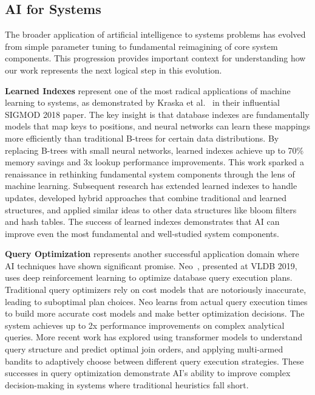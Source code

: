 \subsection{AI for Systems}

The broader application of artificial intelligence to systems problems has evolved from simple parameter tuning to fundamental reimagining of core system components. This progression provides important context for understanding how our work represents the next logical step in this evolution.

\textbf{Learned Indexes} represent one of the most radical applications of machine learning to systems, as demonstrated by Kraska et al.~\cite{kraska2018learned} in their influential SIGMOD 2018 paper. The key insight is that database indexes are fundamentally models that map keys to positions, and neural networks can learn these mappings more efficiently than traditional B-trees for certain data distributions. By replacing B-trees with small neural networks, learned indexes achieve up to 70\% memory savings and 3x lookup performance improvements. This work sparked a renaissance in rethinking fundamental system components through the lens of machine learning. Subsequent research has extended learned indexes to handle updates, developed hybrid approaches that combine traditional and learned structures, and applied similar ideas to other data structures like bloom filters and hash tables. The success of learned indexes demonstrates that AI can improve even the most fundamental and well-studied system components.

\textbf{Query Optimization} represents another successful application domain where AI techniques have shown significant promise. Neo~\cite{marcus2019neo}, presented at VLDB 2019, uses deep reinforcement learning to optimize database query execution plans. Traditional query optimizers rely on cost models that are notoriously inaccurate, leading to suboptimal plan choices. Neo learns from actual query execution times to build more accurate cost models and make better optimization decisions. The system achieves up to 2x performance improvements on complex analytical queries. More recent work has explored using transformer models to understand query structure and predict optimal join orders, and applying multi-armed bandits to adaptively choose between different query execution strategies. These successes in query optimization demonstrate AI's ability to improve complex decision-making in systems where traditional heuristics fall short.

